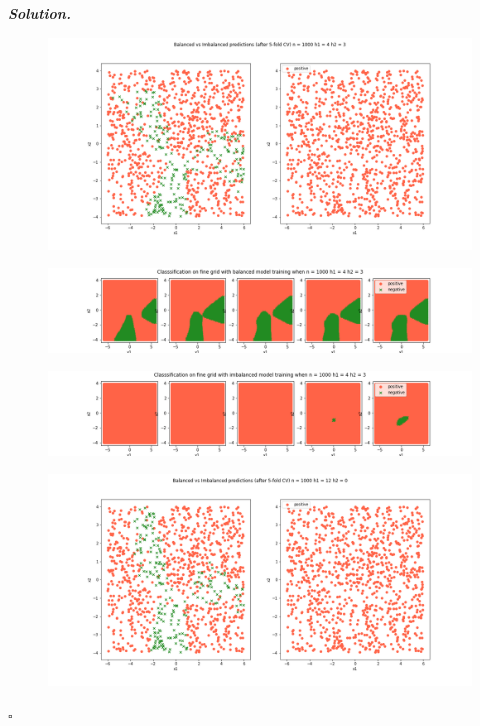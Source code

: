 \documentclass[10pt]{article}
\newenvironment{solution}[1][\it{Solution}]{\textbf{#1. } }{$\square$}
\begin{document}
\begin{solution}
\begin{figure}[H]
\end{figure}
\begin{figure}[H]
\includegraphics[width=16cm, keepaspectratio]{./3/28}
\end{figure}
\begin{figure}[H]
\includegraphics[width=16cm, keepaspectratio]{./3/29}
\end{figure}
\begin{figure}[H]
\includegraphics[width=16cm, keepaspectratio]{./3/30}
\end{figure}
\begin{figure}[H]
\includegraphics[width=16cm, keepaspectratio]{./3/31}
\end{figure}

\end{solution}
\end{document}
